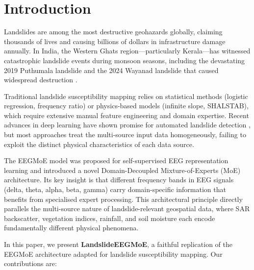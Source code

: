 \documentclass[conference]{IEEEtran}
\begin{document}
\section{Introduction}

Landslides are among the most destructive geohazards globally, claiming thousands of lives and causing billions of dollars in infrastructure damage annually. In India, the Western Ghats region—particularly Kerala—has witnessed catastrophic landslide events during monsoon seasons, including the devastating 2019 Puthumala landslide and the 2024 Wayanad landslide that caused widespread destruction \cite{wayanad2024}.

Traditional landslide susceptibility mapping relies on statistical methods (logistic regression, frequency ratio) or physics-based models (infinite slope, SHALSTAB), which require extensive manual feature engineering and domain expertise. Recent advances in deep learning have shown promise for automated landslide detection \cite{dl_landslide}, but most approaches treat the multi-source input data homogeneously, failing to exploit the distinct physical characteristics of each data source.

The EEGMoE model \cite{eegmoe2026} was proposed for self-supervised EEG representation learning and introduced a novel Domain-Decoupled Mixture-of-Experts (MoE) architecture. Its key insight is that different frequency bands in EEG signals (delta, theta, alpha, beta, gamma) carry domain-specific information that benefits from specialised expert processing. This architectural principle directly parallels the multi-source nature of landslide-relevant geospatial data, where SAR backscatter, vegetation indices, rainfall, and soil moisture each encode fundamentally different physical phenomena.

In this paper, we present \textbf{LandslideEEGMoE}, a faithful replication of the EEGMoE architecture adapted for landslide susceptibility mapping. Our contributions are:
\end{document}
